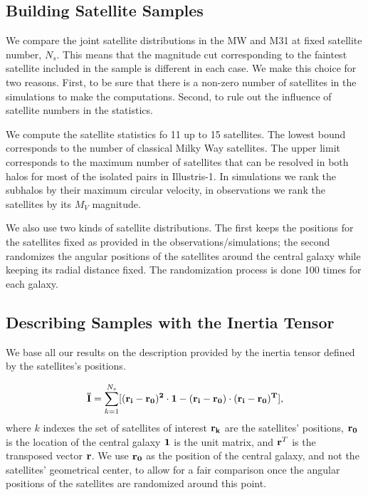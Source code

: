 \documentclass[a4paper,fleqn,usenatbib]{mnras}
\begin{document}
\subsection{Building Satellite Samples}

We compare the joint satellite distributions in the MW and M31 at fixed
satellite number, $N_s$.
This means that the magnitude cut corresponding to the faintest
satellite included in the sample is different in each case.
We make this choice for two reasons. 
First, to be sure that there is a non-zero number of satellites in the
simulations to make the computations.  
Second, to rule out the influence of satellite numbers in the
statistics. 

We compute the satellite statistics fo 11 up to 15 satellites.
The lowest bound corresponds to the number of classical Milky Way
satellites.
The upper limit corresponds to the maximum number of satellites that
can be resolved in both halos for most of the isolated pairs in Illustris-1.
In simulations we rank the subhalos by their maximum
circular velocity, in observations we rank the satellites by its $M_V$
magnitude. 

We also use two kinds of satellite distributions. 
The first keeps the positions for the satellites fixed as provided in
the observations/simulations; the second randomizes the angular positions of
the satellites around the central galaxy while keeping its radial
distance fixed. The randomization process is done 100 times for each
galaxy. 


\subsection{Describing Samples with the Inertia Tensor}
We base all our results on the description provided by the inertia
tensor defined by the satellites's positions.  

\begin{equation}
{\bf{\bar{I}}} = \sum_{k=1}^{N_s}[(\bf{r}_i - \bf{r}_0)^2\cdot \bf{1} -
  (\bf{r}_i-\bf{r}_0)\cdot (\bf{r}_i - \bf{r}_0)^{T}],
\end{equation}
%
where $k$ indexes the set of satellites of interest
$\bf{r}_k$ are the satellites' positions, $\bf{r}_{0}$ is the location
of the central galaxy $\bf{1}$ is the unit matrix,  and  
${\bf r}^T$ is the transposed vector $\bf{r}$. 
We use $\bf{r}_0$ as the position of the central galaxy, and not the
satellites' geometrical center, to allow for a fair comparison once
the angular positions of the satellites are randomized around this
point. 
\end{document}
